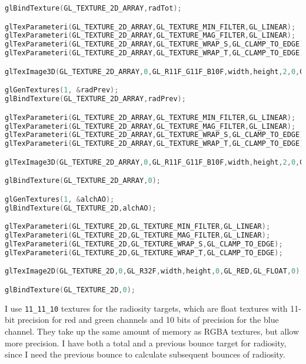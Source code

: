 \begin{lstlisting}[caption={RenderEngine.cpp},language=c++]
glBindTexture(GL_TEXTURE_2D_ARRAY,radTot);

glTexParameteri(GL_TEXTURE_2D_ARRAY,GL_TEXTURE_MIN_FILTER,GL_LINEAR);
glTexParameteri(GL_TEXTURE_2D_ARRAY,GL_TEXTURE_MAG_FILTER,GL_LINEAR);
glTexParameteri(GL_TEXTURE_2D_ARRAY,GL_TEXTURE_WRAP_S,GL_CLAMP_TO_EDGE);
glTexParameteri(GL_TEXTURE_2D_ARRAY,GL_TEXTURE_WRAP_T,GL_CLAMP_TO_EDGE);

glTexImage3D(GL_TEXTURE_2D_ARRAY,0,GL_R11F_G11F_B10F,width,height,2,0,GL_RGB,GL_FLOAT,0);

glGenTextures(1, &radPrev);
glBindTexture(GL_TEXTURE_2D_ARRAY,radPrev);

glTexParameteri(GL_TEXTURE_2D_ARRAY,GL_TEXTURE_MIN_FILTER,GL_LINEAR);
glTexParameteri(GL_TEXTURE_2D_ARRAY,GL_TEXTURE_MAG_FILTER,GL_LINEAR);
glTexParameteri(GL_TEXTURE_2D_ARRAY,GL_TEXTURE_WRAP_S,GL_CLAMP_TO_EDGE);
glTexParameteri(GL_TEXTURE_2D_ARRAY,GL_TEXTURE_WRAP_T,GL_CLAMP_TO_EDGE);

glTexImage3D(GL_TEXTURE_2D_ARRAY,0,GL_R11F_G11F_B10F,width,height,2,0,GL_RGB,GL_FLOAT,0);

glBindTexture(GL_TEXTURE_2D_ARRAY,0);

glGenTextures(1, &alchAO);
glBindTexture(GL_TEXTURE_2D,alchAO);

glTexParameteri(GL_TEXTURE_2D,GL_TEXTURE_MIN_FILTER,GL_LINEAR);
glTexParameteri(GL_TEXTURE_2D,GL_TEXTURE_MAG_FILTER,GL_LINEAR);
glTexParameteri(GL_TEXTURE_2D,GL_TEXTURE_WRAP_S,GL_CLAMP_TO_EDGE);
glTexParameteri(GL_TEXTURE_2D,GL_TEXTURE_WRAP_T,GL_CLAMP_TO_EDGE);

glTexImage2D(GL_TEXTURE_2D,0,GL_R32F,width,height,0,GL_RED,GL_FLOAT,0);

glBindTexture(GL_TEXTURE_2D,0);
\end{lstlisting}
I use \verb=11_11_10= textures for the radiosity targets, which are float textures with 11-bit precision for red and green channels and 10 bits of precision for the blue channel. They take up the same amount of memory as RGBA textures, but allow more precision. I have both a total and a previous bounce target for radiosity, since I need the previous bounce to calculate subsequent bounces of radiosity.

